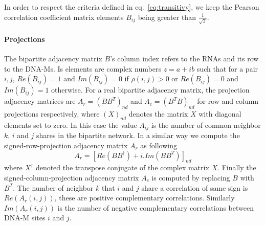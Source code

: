 \documentclass[10pt,a4paper]{article}
\begin{document}
In order to respect the criteria defined in eq.~\ref{eq:transitivy}, we keep the Pearson correlation coefficient matrix elements $B_{ij}$ being greater than $\frac{1}{\sqrt{2}}$.

\paragraph{Projections}
The bipartite adjacency matrix $B$'s column index refers to the RNAs and its row to the DNA-Ms. Is elements are complex numbers $z=a+ib$ such that for a pair $i,j$, $Re(B_{ij})=1$ and $Im(B_{ij})=0$ if $\rho(i,j)>0$ or $Re(B_{ij})=0$ and $Im(B_{ij})=1$ otherwise. For a real bipartite adjacency matrix, the projection adjacency matrices are $A_{r}=(BB^{T})_{nd}$ and $A_{c}=(B^{T}B)_{nd}$ for row and column projections respectively, where $(X)_{nd}$ denotes the matrix $X$ with diagonal elements set to zero. In this case the value $A_{ij}$ is the number of common neighbor $k$, $i$ and $j$ shares in the bipartite network. In a similar way we compute the signed-row-projection adjacency matrix $A_{r}$ as following
\begin{equation}
A_{r}=[Re(BB^{\dagger}) + i.Im(BB^{T})]_{nd}
\label{eq:signedproj}
\end{equation}
where $X^{\dagger}$ denoted the transpose conjugate of the complex matrix $X$. Finally the signed-column-projection adjacency matrix $A_{c}$ is computed by replacing $B$ with $B^{T}$. The number of neighbor $k$ that $i$ and $j$ share a correlation of same sign is $Re(A_{r}(i,j))$, these are positive complementary correlations. Similarly $Im(A_{r}(i,j))$ is the number of negative complementary correlations between DNA-M sites $i$ and $j$.
\end{document}
